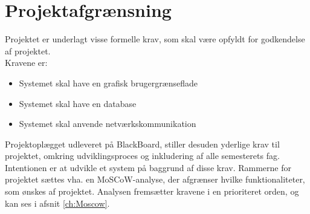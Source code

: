 \chapter{Projektafgrænsning}\label{ch:projektafgraensning}
Projektet er underlagt visse formelle krav, som skal være opfyldt for godkendelse af projektet. \\
Kravene er:
\begin{itemize}[noitemsep]
	\item Systemet skal have en grafisk brugergrænseflade
	\item Systemet skal have en database
	\item Systemet skal anvende netværkskommunikation
\end{itemize}

\noindent Projektoplægget udleveret på BlackBoard, stiller desuden yderlige krav til projektet, omkring udviklingsproces og inkludering af alle semesterets fag. Intentionen er at udvikle et system på baggrund af disse krav. Rammerne for projektet sættes vha. en MoSCoW-analyse, der afgrænser hvilke funktionaliteter, som ønskes af projektet. Analysen fremsætter kravene i en prioriteret orden, og kan ses i afsnit \ref{ch:Moscow}.
%
